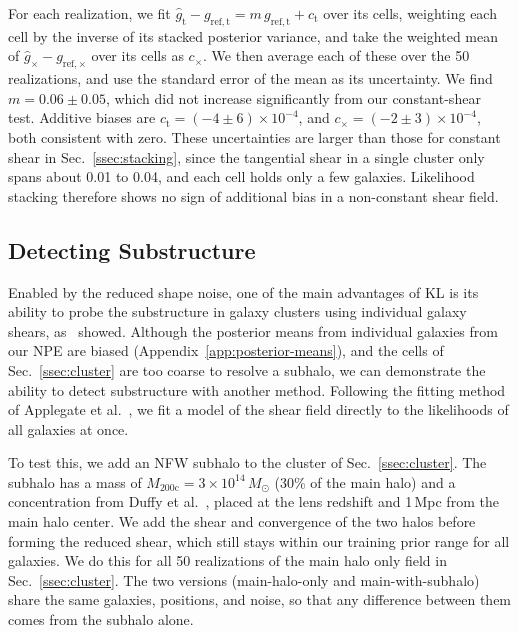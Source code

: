 For each realization, we fit $\hat{g}_\mathrm{t} - g_{\mathrm{ref,t}} = m\, g_{\mathrm{ref,t}} + c_\mathrm{t}$ over its cells, weighting each cell by the inverse of its stacked posterior variance, and take the weighted mean of $\hat{g}_\times - g_{\mathrm{ref},\times}$ over its cells as $c_\times$. We then average each of these over the 50 realizations, and use the standard error of the mean as its uncertainty. We find $m = 0.06 \pm 0.05$, which did not increase significantly from our constant-shear test. Additive biases are $c_\mathrm{t} = (-4 \pm 6) \times 10^{-4}$, and $c_\times = (-2 \pm 3) \times 10^{-4}$, both consistent with zero. These uncertainties are larger than those for constant shear in Sec.~\ref{ssec:stacking}, since the tangential shear in a single cluster only spans about 0.01 to 0.04, and each cell holds only a few galaxies.  Likelihood stacking therefore shows no sign of additional bias in a non-constant shear field.

\subsection{Detecting Substructure}
\label{ssec:substructure}

Enabled by the reduced shape noise, one of the main advantages of KL is its ability to probe the substructure in galaxy clusters using individual galaxy shears, as~\citep{KLCluster} showed. Although the posterior means from individual galaxies from our NPE are biased (Appendix~\ref{app:posterior-means}), and the cells of Sec.~\ref{ssec:cluster} are too coarse to resolve a subhalo, we can demonstrate the ability to detect substructure with another method. Following the fitting method of Applegate et al.~\citep{WtG3}, we fit a model of the shear field directly to the likelihoods of all galaxies at once.

To test this, we add an NFW subhalo to the cluster of Sec.~\ref{ssec:cluster}. The subhalo has a mass of $M_\mathrm{200c} = 3\times10^{14}\,M_\odot$ (30\% of the main halo) and a concentration from Duffy et al.~\citep{Duffy08}, placed at the lens redshift and 1\,Mpc from the main halo center. We add the shear and convergence of the two halos before forming the reduced shear, which still stays within our training prior range for all galaxies. We do this for all 50 realizations of the main halo only field in Sec.~\ref{ssec:cluster}. The two versions (main-halo-only and main-with-subhalo) share the same galaxies, positions, and noise, so that any difference between them comes from the subhalo alone.

